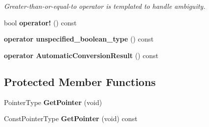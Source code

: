 \begin{DoxyCompactItemize}
\begin{DoxyCompactList}\small\item\em Greater-\/than-\/or-\/equal-\/to operator is templated to handle ambiguity. \end{DoxyCompactList}\item 
\hypertarget{classLoki_1_1StrongPtr_a454e741ad547af40bdc240bc3ebc68cd}{}bool {\bfseries operator!} () const \label{classLoki_1_1StrongPtr_a454e741ad547af40bdc240bc3ebc68cd}

\item 
\hypertarget{classLoki_1_1StrongPtr_abc8d2dbdb03105a673d2fce42b61acde}{}{\bfseries operator unspecified\+\_\+boolean\+\_\+type} () const \label{classLoki_1_1StrongPtr_abc8d2dbdb03105a673d2fce42b61acde}

\item 
\hypertarget{classLoki_1_1StrongPtr_a8ea7603a611a53592ae7f87e69aebcc4}{}{\bfseries operator Automatic\+Conversion\+Result} () const \label{classLoki_1_1StrongPtr_a8ea7603a611a53592ae7f87e69aebcc4}

\end{DoxyCompactItemize}
\subsection*{Protected Member Functions}
\begin{DoxyCompactItemize}
\item 
\hypertarget{classLoki_1_1StrongPtr_a9a64252b4688dc50287b378b37c6871a}{}Pointer\+Type {\bfseries Get\+Pointer} (void)\label{classLoki_1_1StrongPtr_a9a64252b4688dc50287b378b37c6871a}

\item 
\hypertarget{classLoki_1_1StrongPtr_aaf04d4e7ec76fdfc8f254901f0626048}{}Const\+Pointer\+Type {\bfseries Get\+Pointer} (void) const \label{classLoki_1_1StrongPtr_aaf04d4e7ec76fdfc8f254901f0626048}

\end{DoxyCompactItemize}
